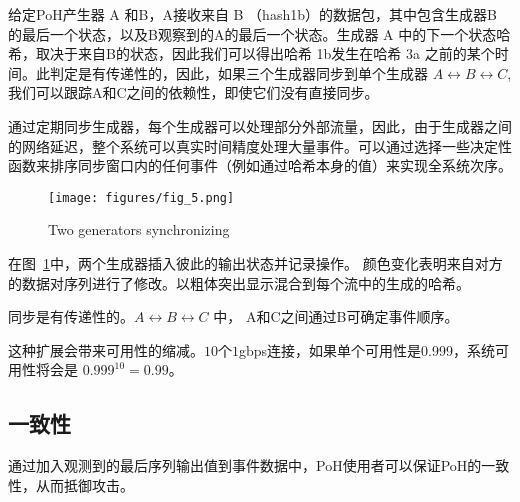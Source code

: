 \documentclass[12pt, uft8]{ctexart}
\begin{document}
给定PoH产生器 A 和B，A接收来自 B （hash1b）的数据包，其中包含生成器B 的最后一个状态，以及B观察到的A的最后一个状态。生成器 A 中的下一个状态哈希，取决于来自B的状态，因此我们可以得出哈希 1b发生在哈希 3a 之前的某个时间。此判定是有传递性的，因此，如果三个生成器同步到单个生成器  \(A \leftrightarrow B \leftrightarrow C\), 我们可以跟踪A和C之间的依赖性，即使它们没有直接同步。

通过定期同步生成器，每个生成器可以处理部分外部流量，因此，由于生成器之间的网络延迟，整个系统可以真实时间精度处理大量事件。可以通过选择一些决定性函数来排序同步窗口内的任何事件（例如通过哈希本身的值）来实现全系统次序。


\begin{figure}
  \begin{center}
    \centering
    \texttt{[image: figures/fig\_5.png]}
    \caption[Fig 5]{Two generators synchronizing\label{fig:poh_scale}}
  \end{center}
  \end{figure}

在图~\ref{fig:poh_scale}中，两个生成器插入彼此的输出状态并记录操作。 颜色变化表明来自对方的数据对序列进行了修改。以粗体突出显示混合到每个流中的生成的哈希。  

同步是有传递性的。\(A \leftrightarrow B \leftrightarrow C\) 中， A和C之间通过B可确定事件顺序。

这种扩展会带来可用性的缩减。$10$个$1$gbps连接，如果单个可用性是0.999，系统可用性将会是 \(0.999^{10} = 0.99 \)。

\subsection{一致性}
通过加入观测到的最后序列输出值到事件数据中，PoH使用者可以保证PoH的一致性，从而抵御攻击。\\
\end{document}
